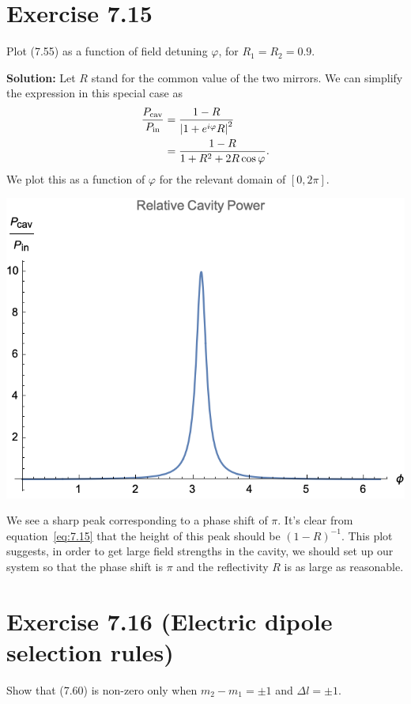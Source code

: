 \documentclass{book}
\begin{document}
\section*{Exercise 7.15}
    Plot (7.55) as a function of field detuning $\varphi$, for $R_1 = R_2 = 0.9$.

    \textbf{Solution:} Let $R$ stand for the common value of the two mirrors. We can simplify the expression in this special case as 
    \begin{align} \label{eq:7.15}
    \begin{aligned}
        \frac{P_{\rm cav}}{P_{\rm in}} &= \frac{1-R}{\abs{1 + e^{i\varphi}R}^2} \\
        &= \frac{1-R}{1 + R^2 + 2 R \cos \varphi}.
    \end{aligned}
    \end{align}
    We plot this as a function of $\varphi$ for the relevant domain of $[0,2\pi]$.
    \begin{center}
        \includegraphics{Exercise7.15.png}
    \end{center}
    We see a sharp peak corresponding to a phase shift of $\pi$. It's clear from equation~\eqref{eq:7.15} that the height of this peak should be $(1-R)^{-1}$. This plot suggests, in order to get large field strengths in the cavity, we should set up our system so that the phase shift is $\pi$ and the reflectivity $R$ is as large as reasonable.

\section{Exercise 7.16 (Electric dipole selection rules)}
    Show that (7.60) is non-zero only when $m_2 - m_1 = \pm 1$ and $\Delta l = \pm 1$.
\end{document}
